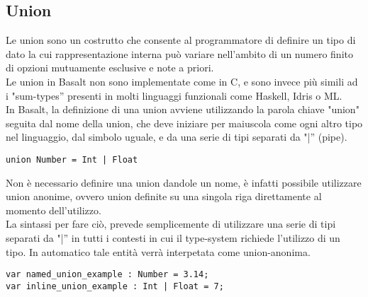 \subsection{Union}
Le union sono un costrutto che consente al programmatore di definire un tipo di dato la cui rappresentazione 
interna può variare nell’ambito di un numero finito di opzioni mutuamente esclusive e note a priori. \\ 

Le union in Basalt non sono implementate come in C, e sono invece più simili ad i "sum-types” presenti in molti 
linguaggi funzionali come Haskell, Idris o ML. \\

In Basalt, la definizione di una union avviene utilizzando la parola chiave "union" seguita dal nome della union, 
che deve iniziare per maiuscola come ogni altro tipo nel linguaggio, dal simbolo uguale, 
e da una serie di tipi separati da "|” (pipe). \\

\vspace{0.5cm}
\begin{lstlisting}[frame=single]
union Number = Int | Float
\end{lstlisting}
\vspace{0.5cm}

Non è necessario definire una union dandole un nome, è infatti possibile utilizzare union anonime, 
ovvero union definite su una singola riga direttamente al momento dell’utilizzo. \\

La sintassi per fare ciò, prevede semplicemente di utilizzare  una serie di tipi separati da "|”
in tutti i contesti in cui il type-system richiede l’utilizzo di un tipo. In automatico 
tale entità verrà interpetata come union-anonima. \\

\vspace{0.5cm}
\begin{lstlisting}[frame=single]
var named_union_example : Number = 3.14;     
var inline_union_example : Int | Float = 7;
\end{lstlisting}
\vspace{0.5cm}


\newpage
 

\newpage

 

\newpage
 

\newpage